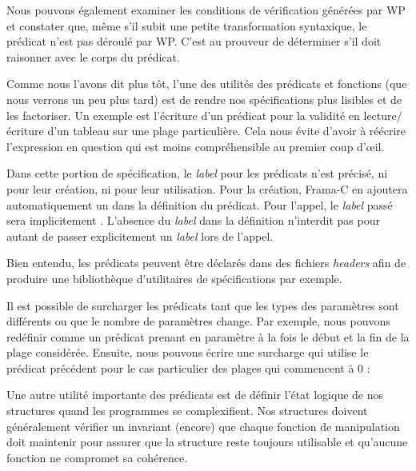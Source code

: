 Nous pouvons également examiner les conditions de vérification générées par WP et constater que,
même s'il subit une petite transformation syntaxique, le prédicat n'est pas
déroulé par WP. C'est au prouveur de déterminer s'il doit raisonner avec le
corps du prédicat.




Comme nous l'avons dit plus tôt, l'une des utilités des prédicats et fonctions (que
nous verrons un peu plus tard) est de rendre nos spécifications plus lisibles et
de les factoriser. Un exemple est l'écriture d'un prédicat pour la validité en
lecture/écriture d'un tableau sur une plage particulière. Cela nous évite d'avoir
à réécrire l'expression en question qui est moins compréhensible au premier
coup d’œil.






Dans cette portion de spécification, le \textit{label} pour les prédicats n'est
précisé, ni pour leur création, ni pour leur utilisation. Pour la création,
Frama-C en ajoutera automatiquement un dans la définition du prédicat.
Pour l'appel, le \textit{label} passé sera implicitement .
L'absence du \textit{label} dans la définition n'interdit pas pour autant de
passer explicitement un \textit{label} lors de l'appel.



Bien entendu, les prédicats peuvent être déclarés dans des fichiers \textit{headers} afin
de produire une bibliothèque d'utilitaires de spécifications par exemple.



Il est possible de surcharger les prédicats tant que les types des paramètres
sont différents ou que le nombre de paramètres change. Par exemple, nous
pouvons redéfinir  comme un prédicat prenant
en paramètre à la fois le début et la fin de la plage considérée. Ensuite,
nous pouvons écrire une surcharge qui utilise le prédicat précédent pour le
cas particulier des plages qui commencent à 0 :







Une autre utilité importante des prédicats est de définir l'état logique de nos
structures quand les programmes se complexifient. Nos structures doivent
généralement vérifier un invariant (encore) que chaque fonction de manipulation
doit maintenir pour assurer que la structure reste toujours utilisable et
qu'aucune fonction ne compromet sa cohérence.



